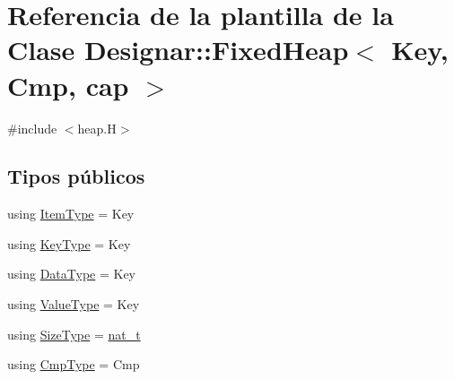 \hypertarget{class_designar_1_1_fixed_heap}{}\section{Referencia de la plantilla de la Clase Designar\+:\+:Fixed\+Heap$<$ Key, Cmp, cap $>$}
\label{class_designar_1_1_fixed_heap}


{\ttfamily \#include $<$heap.\+H$>$}

\subsection*{Tipos públicos}
\begin{DoxyCompactItemize}
\item 
using \hyperlink{class_designar_1_1_fixed_heap_adf444211fa73830a09b3847ebe15bc9b}{Item\+Type} = Key
\item 
using \hyperlink{class_designar_1_1_fixed_heap_a2dbe3b22cba3e316803b614fba2d13e8}{Key\+Type} = Key
\item 
using \hyperlink{class_designar_1_1_fixed_heap_a48202f857a59e2753aa72625f0d90f94}{Data\+Type} = Key
\item 
using \hyperlink{class_designar_1_1_fixed_heap_a33def2622f3d95c165abf62ce2edcb73}{Value\+Type} = Key
\item 
using \hyperlink{class_designar_1_1_fixed_heap_a138d26dc24cbab61001f528a29b5154b}{Size\+Type} = \hyperlink{namespace_designar_aa72662848b9f4815e7bf31a7cf3e33d1}{nat\+\_\+t}
\item 
using \hyperlink{class_designar_1_1_fixed_heap_a0dab9096a5119723285ee3d4f1a4cee9}{Cmp\+Type} = Cmp
\end{DoxyCompactItemize}
